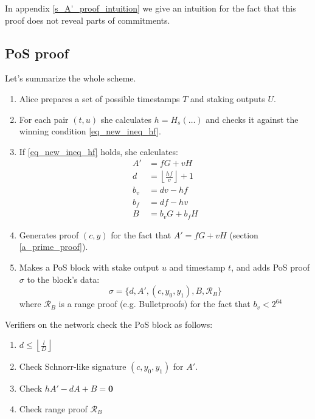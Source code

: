 \documentclass{article}
\newcommand{\floor}[1]{\left\lfloor #1 \right\rfloor}
\numberwithin{figure}{section}
\begin{document}
In appendix \ref{s_A'_proof_intuition} we give an intuition for the fact that this proof does not reveal parts of commitments.

\subsection{PoS proof} \label{ssec_pos_proof}

Let's summarize the whole scheme.

\begin{enumerate}
    \item Alice prepares a set of possible timestamps $T$ and staking outputs $U$.
    
    \item For each pair $(t, u)$ she calculates $h = H_s(\dots)$ and checks it against the winning condition \eqref{eq_new_ineq_hf}.
    
    \item If \eqref{eq_new_ineq_hf} holds, she calculates:
    \[ \begin{split}
    A' &= fG + vH \\
    d &= \floor{\frac{hf}{v}} + 1\\
    b_v &= dv - hf \\
    b_f &= df - hv \\
    B &= b_v G + b_f H
    \end{split}
    \]
    
    \item Generates proof $(c, y)$ for the fact that $A' = fG + vH$ (section \ref{a_prime_proof}).
    
    \item Makes a PoS block with stake output $u$ and timestamp $t$, and adds PoS proof $\sigma$ to the block's data:
    \begin{equation} \label{eq_pos_proof}
    \sigma = \{ d, A', (c, y_0, y_1), B, \mathcal{R}_B \}
    \end{equation}
    where $\mathcal{R}_B$ is a range proof (e.g. Bulletproofs) for the fact that $b_v < 2^{64}$ 
\end{enumerate}

\noindent 
Verifiers on the network check the PoS block as follows:

\begin{enumerate}
    \item $d \leq \floor{\frac{l}{D}}$
    
    \item Check Schnorr-like signature $(c, y_0, y_1)$ for $A'$.
    
    \item Check $hA'-dA+B=\mathbf{0}$
    
    \item Check range proof $\mathcal{R}_B$
\end{enumerate}
\end{document}
